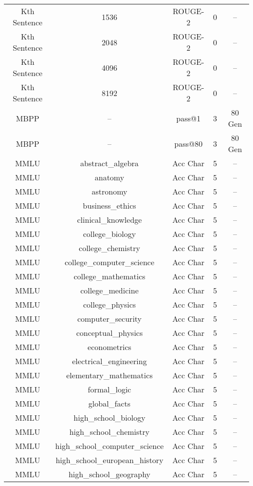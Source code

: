 \begin{longtable}{|c|c|c|c|c|}
    Kth Sentence & 1536 & ROUGE-2 & 0 & -- \\
    Kth Sentence & 2048 & ROUGE-2 & 0 & -- \\
    Kth Sentence & 4096 & ROUGE-2 & 0 & -- \\
    Kth Sentence & 8192 & ROUGE-2 & 0 & -- \\
    MBPP & -- & pass@1 & 3 & 80 Gen \\
    MBPP & -- & pass@80 & 3 & 80 Gen \\
    MMLU & abstract\_algebra & Acc Char & 5 & -- \\
    MMLU & anatomy & Acc Char & 5 & -- \\
    MMLU & astronomy & Acc Char & 5 & -- \\
    MMLU & business\_ethics & Acc Char & 5 & -- \\
    MMLU & clinical\_knowledge & Acc Char & 5 & -- \\
    MMLU & college\_biology & Acc Char & 5 & -- \\
    MMLU & college\_chemistry & Acc Char & 5 & -- \\
    MMLU & college\_computer\_science & Acc Char & 5 & -- \\
    MMLU & college\_mathematics & Acc Char & 5 & -- \\
    MMLU & college\_medicine & Acc Char & 5 & -- \\
    MMLU & college\_physics & Acc Char & 5 & -- \\
    MMLU & computer\_security & Acc Char & 5 & -- \\
    MMLU & conceptual\_physics & Acc Char & 5 & -- \\
    MMLU & econometrics & Acc Char & 5 & -- \\
    MMLU & electrical\_engineering & Acc Char & 5 & -- \\
    MMLU & elementary\_mathematics & Acc Char & 5 & -- \\
    MMLU & formal\_logic & Acc Char & 5 & -- \\
    MMLU & global\_facts & Acc Char & 5 & -- \\
    MMLU & high\_school\_biology & Acc Char & 5 & -- \\
    MMLU & high\_school\_chemistry & Acc Char & 5 & -- \\
    MMLU & high\_school\_computer\_science & Acc Char & 5 & -- \\
    MMLU & high\_school\_european\_history & Acc Char & 5 & -- \\
    MMLU & high\_school\_geography & Acc Char & 5 & -- \\

\end{longtable}
